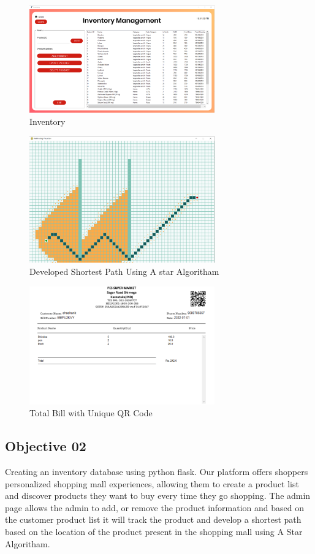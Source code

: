 \documentclass[conference]{IEEEtran}
\begin{document}
\begin{figure}[!htb]
	\centerline{\includegraphics[width=80mm]{iot-05}}
	\caption{Inventory}
	\label{fig}
\end{figure}
\begin{figure}[!htb]
	\centerline{\includegraphics[width=80mm]{iot-06}}
	\caption{Developed Shortest Path Using A star Algoritham}
	\label{fig}
\end{figure}
\begin{figure}[!htb]
	\centerline{\includegraphics[width=80mm]{Image-07}}
	\caption{Total Bill with Unique QR Code}
	\label{fig}
\end{figure}

\subsection{Objective 02}
Creating an inventory database using python flask. Our platform offers shoppers
personalized shopping mall experiences, allowing them to create a product list and
discover products they want to buy every time they go shopping. The admin page allows the admin to add, or remove the product information and based on the customer
product list it will track the product and develop a shortest path based on the location of the product present in the shopping mall using A Star Algoritham.\\
\end{document}
